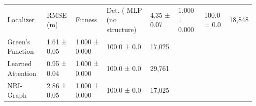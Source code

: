 \begin{tabular}{lllll}
\toprule
Localizer & RMSE (m) & Fitness & Det. (%
\midrule
MLP (no structure) & 4.35 ± 0.07 & 1.000 ± 0.000 & 100.0 ± 0.0 & 18,848 \\
Green's Function & 1.61 ± 0.05 & 1.000 ± 0.000 & 100.0 ± 0.0 & 17,025 \\
Learned Attention & 0.95 ± 0.04 & 1.000 ± 0.000 & 100.0 ± 0.0 & 29,761 \\
NRI-Graph & 2.86 ± 0.05 & 1.000 ± 0.000 & 100.0 ± 0.0 & 17,025 \\
\bottomrule
\end{tabular}
